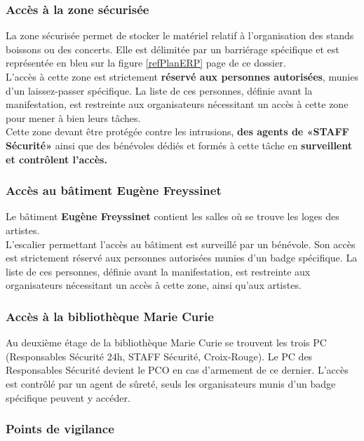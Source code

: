 \documentclass[hidelinks, paper=a4, fontsize=13pt]{report}
\begin{document}
\subsubsection{Accès à la zone sécurisée}

La zone sécurisée permet de stocker le matériel relatif à l’organisation des stands boissons ou des concerts. Elle est délimitée par un barriérage spécifique et est représentée en bleu sur la figure \ref{refPlanERP} page \pageref{refPlanERP} de ce dossier.\\

L’accès à cette zone est strictement \textbf{réservé aux personnes autorisées}, munies d’un laissez-passer spécifique. La liste de ces personnes, définie avant la manifestation, est restreinte aux organisateurs nécessitant un accès à cette zone pour mener à bien leurs tâches. \\

Cette zone devant être protégée contre les intrusions, \textbf{des agents de «STAFF Sécurité»} ainsi que des bénévoles dédiés et formés à cette tâche en \textbf{surveillent et contrôlent l’accès.}

\subsubsection{Accès au bâtiment Eugène Freyssinet}
Le bâtiment \textbf{Eugène Freyssinet} contient les salles où se trouve les loges des artistes. \\
L’escalier permettant l’accès au bâtiment est surveillé par un bénévole. Son accès est strictement réservé aux personnes autorisées munies d’un badge spécifique. La liste de ces personnes, définie avant la manifestation, est restreinte aux organisateurs nécessitant un accès à cette zone, ainsi qu'aux artistes.

\subsubsection{Accès à la bibliothèque Marie Curie}
Au deuxième étage de la bibliothèque Marie Curie se trouvent les trois PC (Responsables Sécurité 24h, STAFF Sécurité, Croix-Rouge). Le PC des Responsables Sécurité devient le PCO en cas d'armement de ce dernier. L'accès est contrôlé par un agent de sûreté, seuls les organisateurs munis d'un badge spécifique peuvent y accéder.


\subsubsection{Points de vigilance}
\end{document}
